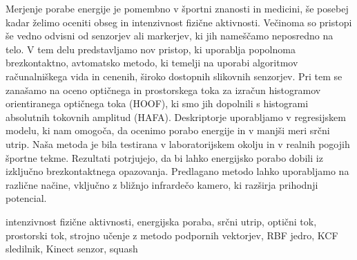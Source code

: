 \povzetekp
Merjenje porabe energije je pomembno v športni znanosti in medicini, še posebej kadar želimo oceniti obseg in intenzivnost fizične aktivnosti. Večinoma so pristopi še vedno odvisni od senzorjev ali markerjev, ki jih nameščamo neposredno na telo. V tem delu predstavljamo nov pristop, ki uporablja popolnoma brezkontaktno, avtomatsko metodo, ki temelji na uporabi algoritmov računalniškega vida in cenenih, široko dostopnih slikovnih senzorjev. Pri tem se zanašamo na oceno optičnega in prostorskega toka za izračun histogramov orientiranega optičnega toka (HOOF), ki smo jih dopolnili s histogrami absolutnih tokovnih amplitud (HAFA). Deskriptorje uporabljamo v regresijskem modelu, ki nam omogoča, da ocenimo porabo energije in v manjši meri srčni utrip. Naša metoda je bila testirana v laboratorijskem okolju in v realnih pogojih športne tekme. Rezultati potrjujejo, da bi lahko energijsko porabo dobili iz izključno brezkontaktnega opazovanja. Predlagano metodo lahko uporabljamo na različne načine, vključno z bližnjo infrardečo kamero, ki razširja prihodnji potencial.


\kljucnebesede intenzivnost fizične aktivnosti, energijska poraba, srčni utrip, optični tok, prostorski tok, strojno učenje z metodo podpornih vektorjev, RBF jedro, KCF sledilnik, Kinect senzor, squash